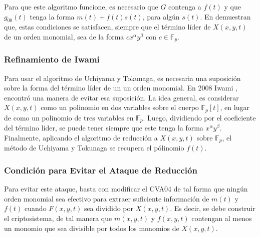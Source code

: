 \documentclass[11pt]{article}
\newcommand{\Fp}{\mathbb{F}_p}
\numberwithin{equation}{section} %
\numberwithin{figure}{section} %
\numberwithin{table}{section} %
\begin{document}
			Para que este algoritmo funcione, es necesario que $G$ contenga a $f(t)$ y que $g_{00}(t)$ tenga la forma $m(t)+f(t)s(t)$, para alg\'un $s(t)$. En \cite{UT} demuestran que, estas condiciones se satisfacen, siempre que el t\'ermino l\'ider de $X(x,y,t)$ de un orden monomial, sea de la forma $cx^\alpha y^\beta$ con $c\in\Fp$.\\

			\subsubsection{Refinamiento de Iwami}
			\label{311Iwami}

				Para usar el algoritmo de Uchiyama y Tokunaga, es necesaria una suposici\'on sobre la forma del t\'ermino l\'ider de un un orden monomial. En 2008 Iwami \cite{Iw08}, encontr\'o una manera de evitar esa suposici\'on. La idea general, es considerar $X(x,y,t)$ como un polinomio en dos variables sobre el cuerpo $\Fp[t]$, en lugar de como un polinomio de tres variables en $\Fp$. Luego, dividiendo por el coeficiente del t\'ermino l\'ider, se puede tener siempre que este tenga la forma $x^\alpha y^\beta$. Finalmente, aplicando el algoritmo de reducci\'on a $X(x,y,t)$ sobre $\Fp$, el m\'etodo de Uchiyama y Tokunaga se recupera el p\'olinomio $f(t)$.

			\subsubsection{Condici\'on para Evitar el Ataque de Reducci\'on}
			\label{312ASEG}

				Para evitar este ataque, basta con modificar el CVA04 de tal forma que ning\'un orden monomial sea efectivo para extraer suficiente informaci\'on de $m(t)$ y $f(t)$ cuando $F(x,y,t)$ sea dividido por $X(x,y,t)$. Es decir, se debe construir el criptosistema, de tal manera que $m(x,y,t)$ y $f(x,y,t)$ contengan al menos un monomio que sea divisible por todos los monomios de $X(x,y,t)$.
\end{document}
